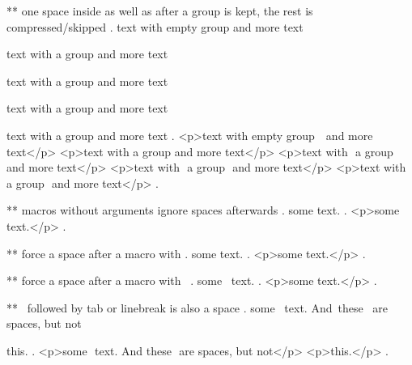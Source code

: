 ** one space inside as well as after a group is kept, the rest is compressed/skipped
.
text with empty group {  } and more text

text with {a group} and more text

text with { a group } and more text

text with { a group  } and more text

text with {  a group  }  and more text
.
<p>text with empty group ​ ​ and more text</p>
<p>text with a group​ and more text</p>
<p>text with ​ a group ​ and more text</p>
<p>text with ​ a group ​ and more text</p>
<p>text with ​ a group ​ and more text</p>
.


** macros without arguments ignore spaces afterwards
.
some \echo  text.
.
<p>some text.</p>
.


** force a space after a macro with {}
.
some \echo{} text.
.
<p>some ​ text.</p>
.


** force a space after a macro with \
.
some \echo\ text.
.
<p>some ​ text.</p>
.


** \ followed by tab or linebreak is also a space
.
some \echo\
text. And\	these
\
are spaces, but not\

this.
.
<p>some ​ text. And​ these ​ are spaces, but not</p>
<p>this.</p>
.

